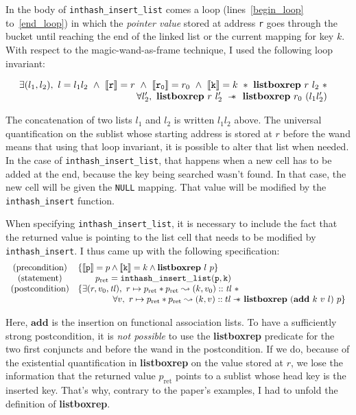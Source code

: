 \documentclass[11pt]{article}
\def\ce{\lstinline[language=C, breaklines=true, columns=fixed]}
\newcommand{\wand}{-\kern-.6em\raisebox{-.659ex}{*}\ } %
\begin{document}
{In the body of \ce{inthash_insert_list} comes a loop (lines~\ref{begin_loop} to~\ref{end_loop}) in which the \emph{pointer value} stored at address \ce{r} goes through the bucket until reaching the end of the linked list or the current mapping for key $k$. With respect to the magic-wand-as-frame technique, I used the following loop invariant:

\[ \begin{array}{rl}
  \exists (l_1, l_2),\ l = l_1l_2\ \wedge\ \llbracket \mathtt{r} \rrbracket = r\ \wedge\ \llbracket \mathtt{r_0} \rrbracket = r_0\ \wedge\ \llbracket \mathtt{k} \rrbracket = k\ *\
   \mathbf{listboxrep}\ r\ l_2\ * & \\
   \forall l_2',\ \mathbf{listboxrep}\ r\ l_2'\ \wand\ \mathbf{listboxrep}\ r_0\ (l_1l_2') & \end{array}\]

The concatenation of two lists $l_1$ and $l_2$ is written $l_1l_2$ above. The universal quantification on the sublist whose starting address is stored at $r$ before the wand means that using that loop invariant, it is possible to alter that list when needed. In the case of \ce{inthash_insert_list}, that happens when a new cell has to be added at the end, because the key being searched wasn't found. In that case, the new cell will be given the \ce{NULL} mapping. That value will be modified by the \ce{inthash_insert} function.

When specifying \ce{inthash_insert_list}, it is necessary to include the fact that the returned value is pointing to the list cell that needs to be modified by \ce{inthash_insert}. I thus came up with the following specification:
\[ \begin{array}{cl}
   \mathrm{(precondition)} & \{ \llbracket \mathtt{p} \rrbracket = p \wedge \llbracket \mathtt{k} \rrbracket = k \wedge \mathbf{listboxrep}\ l\ p \}\\
  \mathrm{(statement)} & \qquad p_\mathrm{ret} = \mathtt{inthash\_insert\_list(p, k)}\\
  \mathrm{(postcondition)} & \{ \exists (r, v_0, \mathit{tl}),\ r \mapsto p_\mathrm{ret} * p_\mathrm{ret} \leadsto (k, v_0)::\mathit{tl}\ *\\
  & \qquad \qquad \forall v,\ r \mapsto p_\mathrm{ret} * p_\mathrm{ret} \leadsto (k, v)::tl \wand \mathbf{listboxrep}\ (\mathbf{add}\ k\ v\ l)\ p\}
\end{array} \]

Here, $\mathbf{add}$ is the insertion on functional association lists.
To have a sufficiently strong postcondition, it is \emph{not possible} to use the \textbf{listboxrep} predicate for the two first conjuncts and before the wand in the postcondition.
If we do, because of the existential quantification in \textbf{listboxrep} on the value stored at $r$, we lose the information that the returned value $p_\mathrm{ret}$ points to a sublist whose head key is the inserted key.
That's why, contrary to the paper's examples, I had to unfold the definition of \textbf{listboxrep}.

}
\end{document}
